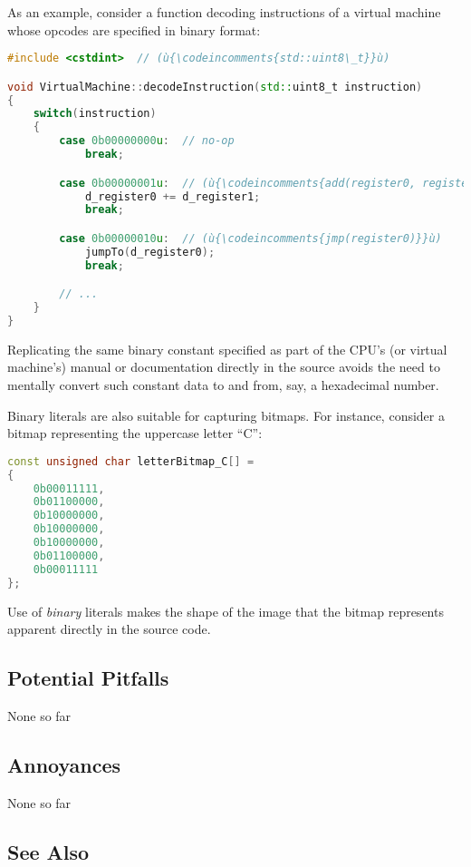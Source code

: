 As an example, consider a function decoding instructions of a virtual
machine whose opcodes are specified in binary format:

\begin{lstlisting}[language=C++]
#include <cstdint>  // (ù{\codeincomments{std::uint8\_t}}ù)

void VirtualMachine::decodeInstruction(std::uint8_t instruction)
{
    switch(instruction)
    {
        case 0b00000000u:  // no-op
            break;

        case 0b00000001u:  // (ù{\codeincomments{add(register0, register1)}}ù)
            d_register0 += d_register1;
            break;

        case 0b00000010u:  // (ù{\codeincomments{jmp(register0)}}ù)
            jumpTo(d_register0);
            break;

        // ...
    }
}
\end{lstlisting}
    

\noindent Replicating the same binary constant specified as part of the CPU's (or
virtual machine's) manual or documentation directly in the source avoids the need to
mentally convert such constant data to and from, say, a hexadecimal
number.

Binary literals are also suitable for capturing bitmaps. For instance,
consider a bitmap representing the uppercase letter ``C'':

\begin{lstlisting}[language=C++]
const unsigned char letterBitmap_C[] =
{
    0b00011111,
    0b01100000,
    0b10000000,
    0b10000000,
    0b10000000,
    0b01100000,
    0b00011111
};
\end{lstlisting}
    

\noindent Use of \emph{binary} literals makes the shape of the image that the
bitmap represents apparent directly in the source code.

\subsection[Potential Pitfalls]{Potential Pitfalls}\label{potential-pitfalls}

None so far

\subsection[Annoyances]{Annoyances}\label{annoyances}

None so far

\subsection[See Also]{See Also}\label{see-also}

